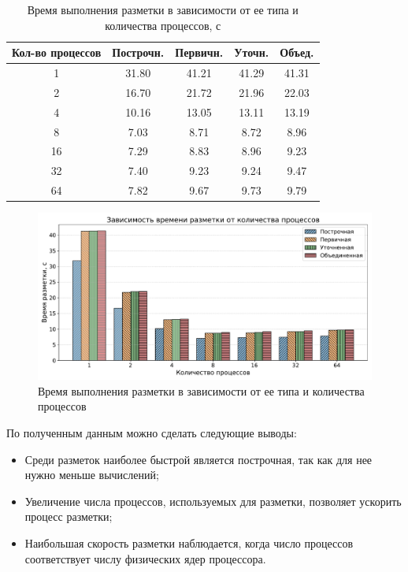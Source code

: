 \begin{table}[H]
    \centering
    \caption{Время выполнения разметки в зависимости от ее типа и количества процессов, с}
    \label{tab:tama}
    \begin{tabular}{|c|c|c|c|c|}
        \hline
        \textbf{Кол-во процессов} & \textbf{Построчн.} & \textbf{Первичн.} & \textbf{Уточн.} & \textbf{Объед.} \\ \hline
        1 & 31.80 & 41.21 & 41.29 & 41.31 \\ \hline
        2 & 16.70 & 21.72 & 21.96 & 22.03 \\ \hline
        4 & 10.16 & 13.05 & 13.11 & 13.19 \\ \hline
        8 & 7.03 & 8.71 & 8.72 & 8.96 \\ \hline
        16 & 7.29 & 8.83 & 8.96 & 9.23 \\ \hline
        32 & 7.40 & 9.23 & 9.24 & 9.47 \\ \hline
        64 & 7.82 & 9.67 & 9.73 & 9.79 \\ \hline
    \end{tabular}
\end{table}

\begin{figure}[H]
	\centering
	\includegraphics[width=\textwidth]{diag/tama_bar.pdf}
    \caption{Время выполнения разметки в зависимости от ее типа и количества процессов}
	\label{fig:tama}
\end{figure}

\newpage

По полученным данным можно сделать следующие выводы:
\begin{itemize}
    \item Среди разметок наиболее быстрой является построчная, так как для нее нужно меньше вычислений;
    \item Увеличение числа процессов, используемых для разметки, позволяет ускорить процесс разметки;
    \item Наибольшая скорость разметки наблюдается, когда число процессов соответствует числу физических ядер процессора.
\end{itemize}

